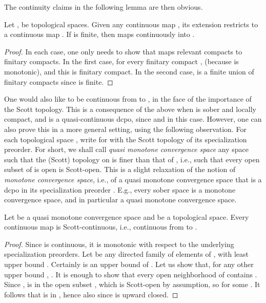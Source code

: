 \documentclass{LMCS}
\begin{document}
The continuity claims in the following lemma are then obvious.
\begin{lem}
  \label{lemma:dagger:new}
  Let ,  be topological spaces.  Given any continuous map , its extension  restricts to a
  continuous map .  If
   is finite, then  maps 
  continuously into .
\end{lem}
\begin{proof}
  In each case, one only needs to show that  maps
  relevant compacts to finitary compacts.  In the first case, for
  every finitary compact , 
  (because  is monotonic), and this is finitary compact.  In the
  second case,  is a
  finite union of finitary compacts since  is finite.
\end{proof}
One would also like  to be continuous from
 to , in the face of the
importance of the Scott topology.  This is a consequence of the above
when  is sober and locally compact, and  is a quasi-continuous
dcpo, since  and  in this case.  However, one can also prove this in a more
general setting, using the following observation.  For each
topological space , write  for  with the Scott
topology of its specialization preorder.  For short, we shall
call {\em quasi monotone convergence space\/} any space  such that
the (Scott) topology on  is finer than that of , i.e.,
such that every open subset of  is open is Scott-open.  This is a
slight relaxation of the notion of {\em monotone convergence space\/},
i.e., of a quasi monotone convergence space that is a dcpo in its
specialization preorder
\cite[Definition~II-3.12]{GHKLMS:contlatt}.  E.g., every sober space
is a monotone convergence space, and in particular a quasi monotone
convergence space.
\begin{lem}
  \label{lemma:fin:cont}
  Let  be a quasi monotone convergence space and  be a
  topological space.  Every continuous map  is
  Scott-continuous, i.e., continuous from  to .
\end{lem}
\begin{proof}
  Since  is continuous, it is monotonic with respect to the
  underlying specialization preorders.  Let  be any
  directed family of elements of , with least upper bound .
  Certainly  is an upper bound of .  Let
  us show that, for any other upper bound , .  It is
  enough to show that every open neighborhood  of  contains
  .  Since ,  is in the open subset ,
  which is Scott-open by assumption, so  for some
  .  It follows that  is in , hence also 
  since  is upward closed.
\end{proof}
\end{document}
